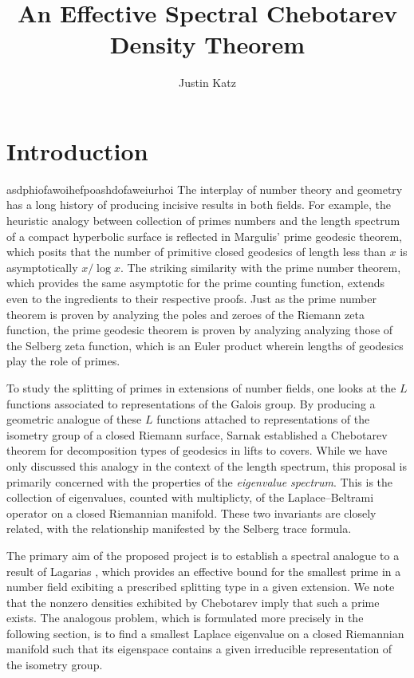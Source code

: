 \documentclass[11pt]{article}
\title{An Effective Spectral Chebotarev Density Theorem }
\author{Justin Katz}
\begin{document}
\maketitle
\section{Introduction}
asdphiofawoihefpoashdofaweiurhoi
The interplay of number theory and geometry has a long history of producing incisive results in both fields. For example, the heuristic analogy between collection of primes numbers and the length spectrum of a compact hyperbolic surface is reflected in Margulis'  \cite{Margulis1969} prime geodesic theorem, which posits that the number of primitive closed geodesics of length less than $x$ is asymptotically  $x/\log x$. The striking similarity with the prime number theorem, which provides the same asymptotic for the prime counting function, extends even to the ingredients to their respective proofs. Just as the prime number theorem is proven by analyzing the poles and zeroes of the Riemann zeta function, the prime geodesic theorem is proven by analyzing analyzing those of the Selberg zeta function, which is an Euler product wherein lengths of geodesics play the role of primes. 

To study the splitting of primes in extensions of number fields, one looks at the $L$ functions associated to representations of the Galois group. By producing a geometric analogue of these $L$ functions attached to representations of the isometry group of a closed Riemann surface, Sarnak \cite{sarnak1982} established a Chebotarev theorem for decomposition types of geodesics in lifts to covers. 
While we have only discussed this analogy in the context of the length spectrum, this proposal is primarily concerned with the properties of the \emph{eigenvalue spectrum}. This is the collection of eigenvalues, counted with multiplicty, of the Laplace--Beltrami operator on a closed Riemannian manifold. These two invariants are closely related, with the relationship manifested by the Selberg trace formula.
 
The primary aim of the proposed project is to establish a spectral analogue to a result of Lagarias \cite{lagarias1979}, which provides an effective bound for the smallest prime in a number field exibiting a prescribed splitting type in a given extension. We note that the nonzero densities exhibited by Chebotarev imply that such a prime exists. The analogous problem, which is formulated more precisely in the following section, is to find a smallest Laplace eigenvalue on a closed Riemannian manifold such that its eigenspace contains a given irreducible representation of the isometry group. 
\end{document}
